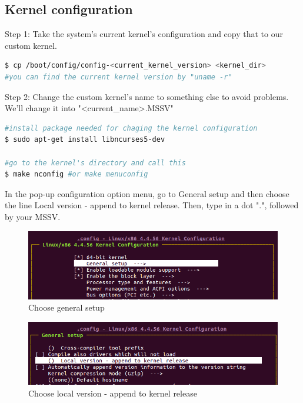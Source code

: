 \documentclass[a4paper]{article}
\begin{document}
\subsection{Kernel configuration}
Step 1: Take the system's current kernel's configuration and copy that to our custom kernel.
\begin{lstlisting}[language=bash]
$ cp /boot/config/config-<current_kernel_version> <kernel_dir>
#you can find the current kernel version by "uname -r"
\end{lstlisting}
Step 2: Change the custom kernel's name to something else to avoid problems. We'll change it into "<current\_name>.MSSV"
\begin{lstlisting}[language=bash]
#install package needed for chaging the kernel configuration
$ sudo apt-get install libncurses5-dev

#go to the kernel's directory and call this
$ make nconfig #or make menuconfig
\end{lstlisting}
In the pop-up configuration option menu, go to General setup and then choose the line Local version - append to kernel release. Then, type in a dot ".", followed by your MSSV.
\begin{center}
    \begin{figure}[H]
    \begin{center}
     \includegraphics[scale=1]{make_nconfig.png}
    \end{center}
    \caption{Choose general setup}
    \end{figure}
\end{center}
\begin{center}
    \begin{figure}[H]
    \begin{center}
     \includegraphics[scale=1]{general_setting.png}
    \end{center}
    \caption{Choose local version - append to kernel release}
    \end{figure}
\end{center}
\end{document}
